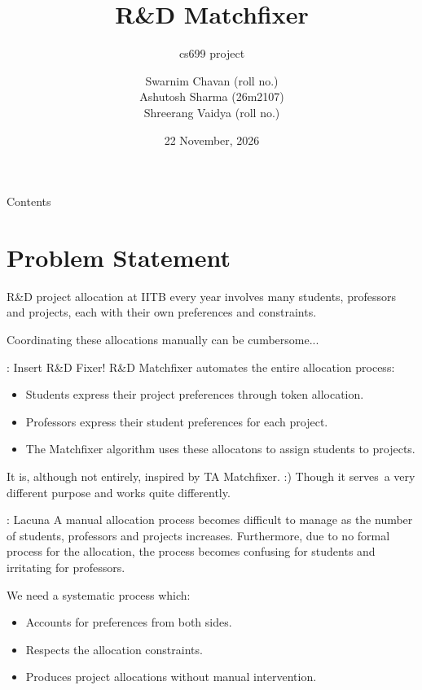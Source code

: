 \documentclass[12pt, aspectratio=169]{beamer}
\title{R\&D Matchfixer}
\subtitle{cs699 project}
\author{Swarnim Chavan (roll no.)\\
  Ashutosh Sharma (26m2107)\\
Shreerang Vaidya (roll no.)}
\date{22 November, 2026}
\begin{document}
\begin{frame}
  \titlepage
\end{frame}

\begin{frame}{Contents}
  \tableofcontents
\end{frame}

\section{Problem Statement}

\begin{frame}{\insertsection}
  R\&D project allocation at IITB every year involves many students, professors
  and projects, each with their own preferences and constraints.

  Coordinating these allocations manually can be cumbersome...
\end{frame}

\begin{frame}{\insertsection: Insert R\&D Fixer!}
  R\&D Matchfixer automates the entire allocation process:
  \begin{itemize}
    \item Students express their project preferences through token allocation.
    \item Professors express their student preferences for each project.
    \item The Matchfixer algorithm uses these allocatons to assign
      students to projects.
  \end{itemize}

It is, although not entirely, inspired by TA Matchfixer. :) Though it serves\
a very different purpose and works quite differently.
\end{frame}

\begin{frame}{\insertsection: Lacuna}
A manual allocation process becomes difficult to manage as the number of
students, professors and projects increases. Furthermore, due to no formal
process for the allocation, the process becomes confusing for students and
irritating for professors.

We need a systematic process which:
\begin{itemize}
  \item Accounts for preferences from both sides.
  \item Respects the allocation constraints.
  \item Produces project allocations without manual intervention.
\end{itemize}
\end{frame}
\end{document}
